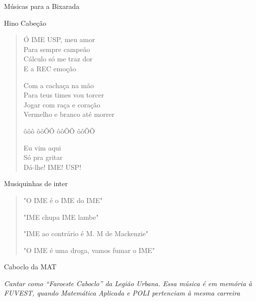\begin{secao}{Músicas para a Bixarada}

\begin{subsecao}{Hino Cabeção}
\begin{verse}

Ó IME USP, meu amor\\
Para sempre campeão\\
Cálculo só me traz dor\\
E a REC emoção

Com a cachaça na mão\\
Para teus times vou torcer\\
Jogar com raça e coração\\
Vermelho e branco até morrer

ôôô ôôÔÔ ôôÔÔ ôôÔÔ

Eu vim aqui\\
Só pra gritar\\
Dá-lhe! IME! USP!
\end{verse}
\end{subsecao}

\begin{subsecao}{Musiquinhas de inter}
\begin{verse}

"O IME é o IME do IME"

"IME chupa IME lambe"

"IME ao contrário é M. M de Mackenzie"

"O IME é uma droga, vamos fumar o IME"

\end{verse}
\end{subsecao}
\pagebreak

\begin{subsecao}{Caboclo da MAT}

{\em Cantar como ``Faroeste Caboclo'' da Legião Urbana. Essa música é em memória 
à FUVEST, quando Matemática Aplicada e POLI pertenciam à mesma carreira}


\end{subsecao}
\end{secao}

